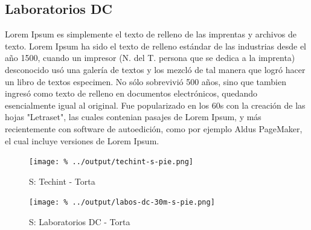 \documentclass[final,narroweqnarray,inline]{ieee}
\begin{document}
  \subsection{Laboratorios DC}

Lorem Ipsum es simplemente el texto de relleno de las imprentas y archivos de texto. Lorem Ipsum ha sido el texto de relleno estándar de las industrias desde el año 1500, cuando un impresor (N. del T. persona que se dedica a la imprenta) desconocido usó una galería de textos y los mezcló de tal manera que logró hacer un libro de textos especimen. No sólo sobrevivió 500 años, sino que tambien ingresó como texto de relleno en documentos electrónicos, quedando esencialmente igual al original. Fue popularizado en los 60s con la creación de las hojas "Letraset", las cuales contenian pasajes de Lorem Ipsum, y más recientemente con software de autoedición, como por ejemplo Aldus PageMaker, el cual incluye versiones de Lorem Ipsum.

    \begin{figure}[h]\begin{center}
      \texttt{[image: \%
      ../output/techint-s-pie.png]}
      \vspace{-3em}
      \caption{S: Techint - Torta}
      \label{techint-s-pie}
    \end{center}\end{figure}

    \begin{figure}[h]\begin{center}
      \texttt{[image: \%
      ../output/labos-dc-30m-s-pie.png]}
      \vspace{-3em}
      \caption{S: Laboratorios DC - Torta}
      \label{labos-dc-30m-s-pie}
    \end{center}\end{figure}
\end{document}
